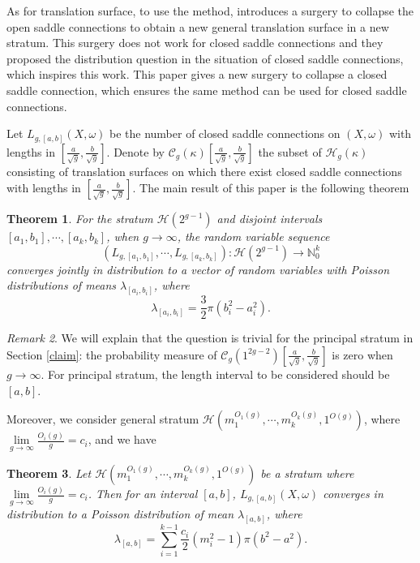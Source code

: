 \documentclass[12pt]{amsart} %
\newtheorem{theorem}{Theorem}[section]
\theoremstyle{definition}
\theoremstyle{remark}
\newtheorem{remark}[theorem]{Remark}
\numberwithin{equation}{section}
\renewcommand\H{{\mathcal H}}
\begin{document}
As for translation surface, to use the method, 
\cite{masur2024lengths} introduces a surgery to collapse the open saddle connections to obtain a new general translation surface in a new stratum.
This surgery does not work for closed saddle connections and they proposed the distribution question in the situation of closed saddle connections,
which inspires this work.
This paper gives a new surgery to collapse a closed saddle connection, which ensures the same method can be used for closed saddle connections.


Let $L_{g,[a,b]}(X,\omega)$ be the number of closed saddle connections on $(X,\omega)$ with lengths in $[\frac{a}{\sqrt{g}},\frac{b}{\sqrt{g}}]$.
Denote by $\mathcal{C}_g(\kappa)[\frac{a}{\sqrt{g}},\frac{b}{\sqrt{g}}]$ the subset of $\H_g(\kappa)$ consisting of translation
surfaces on which there exist closed saddle connections
with lengths in $[\frac{a}{\sqrt{g}},\frac{b}{\sqrt{g}}]$.
The main result of this paper is the following theorem 

\begin{theorem}\label{closed}
For the stratum $\H(2^{g-1})$ and disjoint intervals $[a_1,b_1],\cdots,[a_k,b_k]$, when $g\to \infty$, the random variable sequence
$$(L_{g,[a_1,b_1]},\cdots,L_{g,[a_k,b_k]}):\H(2^{g-1}) \to \mathbb{N}^k_0$$
converges jointly in distribution to a vector of random variables with Poisson distributions of means $\lambda_{[a_i,b_i]}$, where
$$\lambda_{[a_i,b_i]}=\frac{3}{2}\pi(b_i^2-a_i^2).$$
\end{theorem}
\begin{remark}
We will explain that the question is trivial for the principal stratum in Section \ref{claim}: 
the probability measure of $\mathcal{C}_g(1^{2g-2})[\frac{a}{\sqrt{g}},\frac{b}{\sqrt{g}}]$ is zero when $g\to \infty$.
For principal stratum, the length interval to be considered should be $[a,b]$.
\end{remark}


Moreover, we consider general stratum $\H(m_1^{O_1(g)},\cdots,m_k^{O_k(g)},1^{O(g)})$, where $\lim\limits_{g\to \infty}\frac{O_i(g)}{g}=c_i$, and we have
\begin{theorem}\label{general m}
Let $\H(m_1^{O_1(g)},\cdots,m_k^{O_k(g)},1^{O(g)})$ be a stratum where $\lim\limits_{g\to \infty}\frac{O_i(g)}{g}=c_i$.
Then for an interval $[a,b]$, $L_{g,[a,b]}(X,\omega)$ converges in distribution to a Poisson distribution of mean $\lambda_{[a,b]}$, where
$$\lambda_{[a,b]}=\sum_{i=1}^{k-1}\frac{c_i}{2}(m_i^2-1)\pi(b^2-a^2).$$
\end{theorem}
\end{document}
